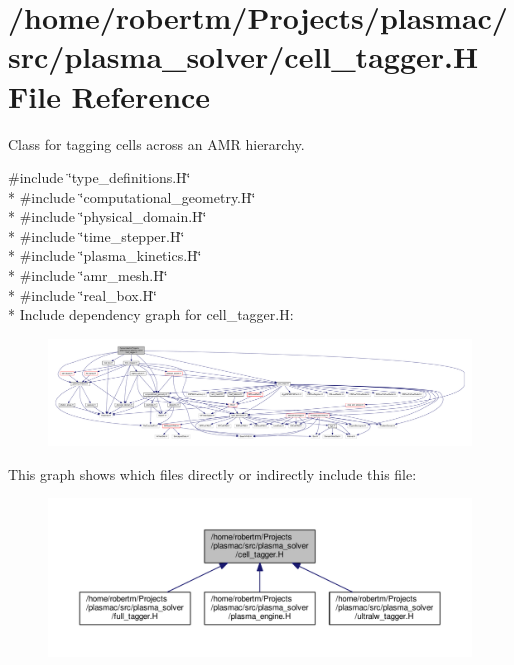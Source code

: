 \hypertarget{cell__tagger_8H}{}\section{/home/robertm/\+Projects/plasmac/src/plasma\+\_\+solver/cell\+\_\+tagger.H File Reference}
\label{cell__tagger_8H}


Class for tagging cells across an A\+MR hierarchy.  


{\ttfamily \#include \char`\"{}type\+\_\+definitions.\+H\char`\"{}}\\*
{\ttfamily \#include \char`\"{}computational\+\_\+geometry.\+H\char`\"{}}\\*
{\ttfamily \#include \char`\"{}physical\+\_\+domain.\+H\char`\"{}}\\*
{\ttfamily \#include \char`\"{}time\+\_\+stepper.\+H\char`\"{}}\\*
{\ttfamily \#include \char`\"{}plasma\+\_\+kinetics.\+H\char`\"{}}\\*
{\ttfamily \#include \char`\"{}amr\+\_\+mesh.\+H\char`\"{}}\\*
{\ttfamily \#include \char`\"{}real\+\_\+box.\+H\char`\"{}}\\*
Include dependency graph for cell\+\_\+tagger.\+H\+:\nopagebreak
\begin{figure}[H]
\begin{center}
\leavevmode
\includegraphics[width=350pt]{cell__tagger_8H__incl}
\end{center}
\end{figure}
This graph shows which files directly or indirectly include this file\+:\nopagebreak
\begin{figure}[H]
\begin{center}
\leavevmode
\includegraphics[width=350pt]{cell__tagger_8H__dep__incl}
\end{center}
\end{figure}
